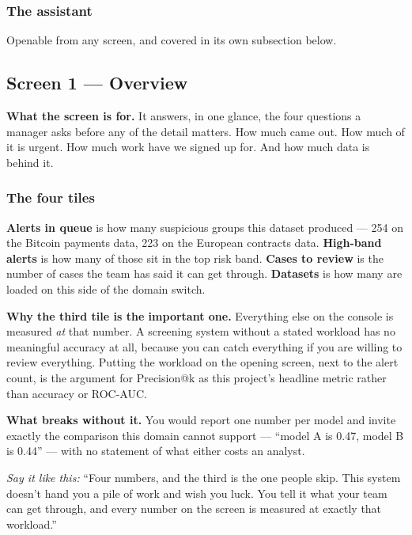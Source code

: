 \documentclass[11pt,a4paper]{article}
\newcommand{\aloud}[1]{\par\smallskip\noindent\textit{\textcolor{accent}{Say
it like this:}} ``#1''\par\smallskip}
\begin{document}
\subsubsection*{The assistant}

Openable from any screen, and covered in its own subsection below.

\subsection{Screen 1 --- Overview}

\textbf{What the screen is for.} It answers, in one glance, the four questions a
manager asks before any of the detail matters. How much came out. How much of
it is urgent. How much work have we signed up for. And how much data is behind
it.

\subsubsection*{The four tiles}

\textbf{Alerts in queue} is how many suspicious groups this dataset produced ---
254 on the Bitcoin payments data, 223 on the European contracts data.
\textbf{High-band alerts} is how many of those sit in the top risk band.
\textbf{Cases to review} is the number of cases the team has said it can get
through. \textbf{Datasets} is how many are loaded on this side of the domain
switch.

\textbf{Why the third tile is the important one.} Everything else on the console
is measured \emph{at} that number. A screening system without a stated workload
has no meaningful accuracy at all, because you can catch everything if you are
willing to review everything. Putting the workload on the opening screen, next
to the alert count, is the argument for Precision@k as this project's headline
metric rather than accuracy or ROC-AUC.

\textbf{What breaks without it.} You would report one number per model and
invite exactly the comparison this domain cannot support --- ``model A is 0.47,
model B is 0.44'' --- with no statement of what either costs an analyst.

\aloud{Four numbers, and the third is the one people skip. This system doesn't
hand you a pile of work and wish you luck. You tell it what your team can get
through, and every number on the screen is measured at exactly that workload.}
\end{document}
